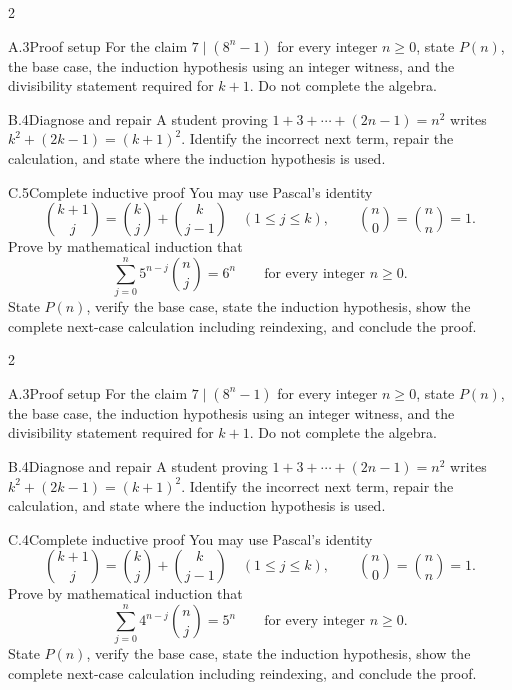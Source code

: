 \documentclass[9pt]{extarticle}
\begin{document}
\CoreWorkArea
\FormBreak
{}
\begin{multicols}{2}
\begin{CompactCoreProblem}{A.3}{Proof setup}
For the claim $7\mid(8^n-1)$ for every integer $n\ge0$, state $P(n)$, the base case, the induction hypothesis using an integer witness, and the divisibility statement required for $k+1$. Do not complete the algebra.
\end{CompactCoreProblem}
\begin{CompactCoreProblem}{B.4}{Diagnose and repair}
A student proving $1+3+\cdots+(2n-1)=n^2$ writes $k^2+(2k-1)=(k+1)^2$. Identify the incorrect next term, repair the calculation, and state where the induction hypothesis is used.
\end{CompactCoreProblem}
\end{multicols}
\begin{CompactCoreProblem}{C.5}{Complete inductive proof}
You may use Pascal's identity
\[
\binom{k+1}{j}=\binom{k}{j}+\binom{k}{j-1}
\quad(1\le j\le k),\qquad
\binom{n}{0}=\binom{n}{n}=1.
\]
Prove by mathematical induction that
\[
\sum_{j=0}^{n} 5^{n-j}\binom{n}{j}=6^n\qquad\text{for every integer }n\ge0.
\]
State $P(n)$, verify the base case, state the induction hypothesis, show the complete next-case calculation including reindexing, and conclude the proof.
\end{CompactCoreProblem}
\CoreWorkArea
\FormBreak
{}
\begin{multicols}{2}
\begin{CompactCoreProblem}{A.3}{Proof setup}
For the claim $7\mid(8^n-1)$ for every integer $n\ge0$, state $P(n)$, the base case, the induction hypothesis using an integer witness, and the divisibility statement required for $k+1$. Do not complete the algebra.
\end{CompactCoreProblem}
\begin{CompactCoreProblem}{B.4}{Diagnose and repair}
A student proving $1+3+\cdots+(2n-1)=n^2$ writes $k^2+(2k-1)=(k+1)^2$. Identify the incorrect next term, repair the calculation, and state where the induction hypothesis is used.
\end{CompactCoreProblem}
\end{multicols}
\begin{CompactCoreProblem}{C.4}{Complete inductive proof}
You may use Pascal's identity
\[
\binom{k+1}{j}=\binom{k}{j}+\binom{k}{j-1}
\quad(1\le j\le k),\qquad
\binom{n}{0}=\binom{n}{n}=1.
\]
Prove by mathematical induction that
\[
\sum_{j=0}^{n} 4^{n-j}\binom{n}{j}=5^n\qquad\text{for every integer }n\ge0.
\]
State $P(n)$, verify the base case, state the induction hypothesis, show the complete next-case calculation including reindexing, and conclude the proof.
\end{CompactCoreProblem}
\end{document}
